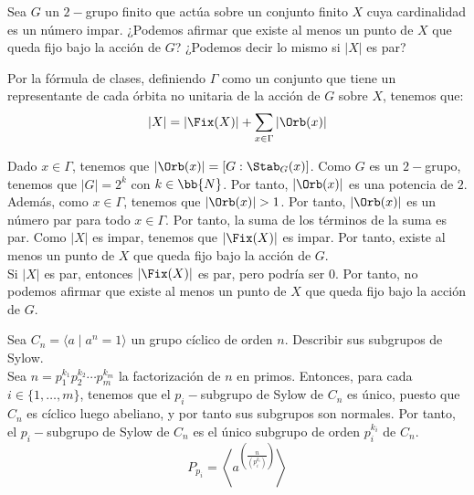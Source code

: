 \begin{ejercicio}
    Sea $G$ un $2-$grupo finito que actúa sobre un conjunto finito $X$ cuya cardinalidad es un número impar. ¿Podemos afirmar que existe al menos un punto de $X$ que queda fijo bajo la acción de $G$? ¿Podemos decir lo mismo si $|X|$ es par?

    Por la fórmula de clases, definiendo $\Gamma$ como un conjunto que tiene un representante de cada órbita no unitaria de la acción de $G$ sobre $X$, tenemos que:
    \begin{equation*}
        |X| = |\Fix(X)| + \sum_{x\in \Gamma} |\Orb(x)|
    \end{equation*}

    Dado $x\in \Gamma$, tenemos que $|\Orb(x)|=[G:\Stab_G(x)]$. Como $G$ es un $2-$grupo, tenemos que $|G|=2^k$ con $k\in \bb{N}$. Por tanto, $|\Orb(x)|$ es una potencia de $2$. Además, como $x\in \Gamma$, tenemos que $|\Orb(x)|>1$. Por tanto, $|\Orb(x)|$ es un número par para todo $x\in \Gamma$. Por tanto, la suma de los términos de la suma es par. Como $|X|$ es impar, tenemos que $|\Fix(X)|$ es impar. Por tanto, existe al menos un punto de $X$ que queda fijo bajo la acción de $G$.\\

    Si $|X|$ es par, entonces $|\Fix(X)|$ es par, pero podría ser $0$. Por tanto, no podemos afirmar que existe al menos un punto de $X$ que queda fijo bajo la acción de $G$.
\end{ejercicio}

\begin{ejercicio}\label{ej:6.14}
    Sea $C_n = \langle a \mid a^n = 1 \rangle$ un grupo cíclico de orden $n$. Describir sus subgrupos de Sylow.\\


    Sea $n=p_1^{k_1}p_2^{k_2}\cdots p_m^{k_m}$ la factorización de $n$ en primos. Entonces, para cada $i\in \{1,\ldots,m\}$, tenemos que el $p_i-$subgrupo de Sylow de $C_n$ es único, puesto que $C_n$ es cíclico luego abeliano, y por tanto sus subgrupos son normales. Por tanto, el $p_i-$subgrupo de Sylow de $C_n$ es el único subgrupo de orden $p_i^{k_i}$ de $C_n$.
    \begin{equation*}
        P_{p_i} = \left\langle a^{\left(\frac{n}{(p_i^{k_i})}\right)} \right\rangle
    \end{equation*}
\end{ejercicio}

